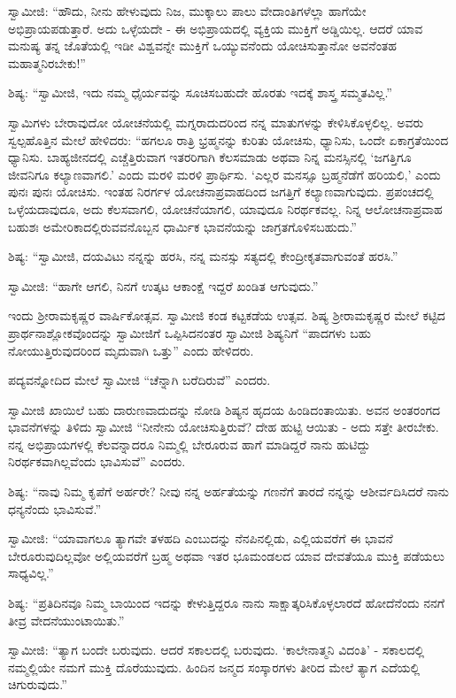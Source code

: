  ಸ್ವಾಮೀಜಿ: “ಹೌದು, ನೀನು ಹೇಳುವುದು ನಿಜ, ಮುಕ್ಕಾಲು ಪಾಲು ವೇದಾಂತಿಗಳೆಲ್ಲಾ ಹಾಗೆಯೇ ಅಭಿಪ್ರಾಯಪಡುತ್ತಾರೆ. ಅದು ಒಳ್ಳೆಯದೇ - ಈ ಅಭಿಪ್ರಾಯದಲ್ಲಿ ವ್ಯಕ್ತಿಯ ಮುಕ್ತಿಗೆ ಅಡ್ಡಿಯಿಲ್ಲ. ಆದರೆ ಯಾವ ಮನುಷ್ಯ ತನ್ನ ಜೊತೆಯಲ್ಲಿ ಇಡೀ ವಿಶ್ವವನ್ನೇ ಮುಕ್ತಿಗೆ ಒಯ್ಯುವನೆಂದು ಯೋಚಿಸುತ್ತಾನೋ ಅವನೆಂತಹ ಮಹಾತ್ಮನಿರಬೇಕು!” 

 ಶಿಷ್ಯ: “ಸ್ವಾಮೀಜಿ, ಇದು ನಮ್ಮ ಧೈರ್ಯವನ್ನು ಸೂಚಿಸಬಹುದೇ ಹೊರತು ಇದಕ್ಕೆ ಶಾಸ್ತ್ರ ಸಮ್ಮತವಿಲ್ಲ.” 

 ಸ್ವಾಮಿಗಳು ಬೇರಾವುದೋ ಯೋಚನೆಯಲ್ಲಿ ಮಗ್ನರಾದುದರಿಂದ ನನ್ನ ಮಾತುಗಳನ್ನು ಕೇಳಿಸಿಕೊಳ್ಳಲಿಲ್ಲ. ಅವರು ಸ್ವಲ್ಪಹೊತ್ತಿನ ಮೇಲೆ ಹೇಳಿದರು: “ಹಗಲೂ ರಾತ್ರಿ ಭ್ರಹ್ಮನನ್ನು ಕುರಿತು ಯೋಚಿಸು, ಧ್ಯಾನಿಸು, ಒಂದೇ ಏಕಾಗ್ರತೆಯಿಂದ ಧ್ಯಾನಿಸು. ಬಾಹ್ಯಜೀನದಲ್ಲಿ ಎಚ್ಚೆತ್ತಿರುವಾಗ ಇತರರಿಗಾಗಿ ಕೆಲಸಮಾಡು ಅಥವಾ ನಿನ್ನ ಮನಸ್ಸಿನಲ್ಲಿ ‘ಜಗತ್ತಿಗೂ ಜೀವನಿಗೂ ಕಲ್ಯಾಣವಾಗಲಿ.’ ಎಂದು ಮರಳಿ ಮರಳಿ ಪ್ರಾರ್ಥಿಸು. ‘ಎಲ್ಲರ ಮನಸ್ಸೂ ಬ್ರಹ್ಮನೆಡೆಗೆ ಹರಿಯಲಿ,’ ಎಂದು ಪುನಃ ಪುನಃ ಯೋಚಿಸು. ಇಂತಹ ನಿರರ್ಗಳ ಯೋಚನಾಪ್ರವಾಹದಿಂದ ಜಗತ್ತಿಗೆ ಕಲ್ಯಾಣವಾಗುವುದು. ಪ್ರಪಂಚದಲ್ಲಿ ಒಳ್ಳೆಯದಾವುದೂ, ಅದು ಕೆಲಸವಾಗಲಿ, ಯೋಚನೆಯಾಗಲಿ, ಯಾವುದೂ ನಿರರ್ಥಕವಲ್ಲ. ನಿನ್ನ ಆಲೋಚನಾಪ್ರವಾಹ ಬಹುಶಃ ಅಮೇರಿಕಾದಲ್ಲಿರುವವನೊಬ್ಬನ ಧಾರ್ಮಿಕ ಭಾವನೆಯನ್ನು ಜಾಗ್ರತಗೊಳಿಸಬಹುದು.” 

 ಶಿಷ್ಯ: “ಸ್ವಾಮೀಜಿ, ದಯವಿಟು ನನ್ನನ್ನು ಹರಸಿ, ನನ್ನ ಮನಸ್ಸು ಸತ್ಯದಲ್ಲಿ ಕೇಂದ್ರೀಕೃತವಾಗುವಂತೆ ಹರಸಿ.” 

 ಸ್ವಾಮೀಜಿ: “ಹಾಗೇ ಆಗಲಿ, ನಿನಗೆ ಉತ್ಕಟ ಆಕಾಂಕ್ಷೆ ಇದ್ದರೆ ಖಂಡಿತ ಆಗುವುದು.” 

\delimiter

 ಇಂದು ಶ‍್ರೀರಾಮಕೃಷ್ಣರ ವಾರ್ಷಿಕೋತ್ಸವ. ಸ್ವಾಮೀಜಿ ಕಂಡ ಕಟ್ಟಕಡೆಯ ಉತ್ಸವ. ಶಿಷ್ಯ ಶ‍್ರೀರಾಮಕೃಷ್ಣರ ಮೇಲೆ ಕಟ್ಟಿದ ಪ್ರಾರ್ಥನಾಶ್ಲೋಕವೊಂದನ್ನು ಸ್ವಾಮೀಜಿಗೆ ಒಪ್ಪಿಸಿದನಂತರ ಸ್ವಾಮೀಜಿ ಶಿಷ್ಯನಿಗೆ “ಪಾದಗಳು ಬಹು ನೋಯುತ್ತಿರುವುದರಿಂದ ಮೃದುವಾಗಿ ಒತ್ತು” ಎಂದು ಹೇಳಿದರು. 

 ಪದ್ಯವನ್ನೋದಿದ ಮೇಲೆ ಸ್ವಾಮೀಜಿ “ಚೆನ್ನಾಗಿ ಬರೆದಿರುವೆ” ಎಂದರು. 

 ಸ್ವಾಮೀಜಿ ಖಾಯಿಲೆ ಬಹು ದಾರುಣವಾದುದನ್ನು ನೋಡಿ ಶಿಷ್ಯನ ಹೃದಯ ಹಿಂಡಿದಂತಾಯಿತು. ಅವನ ಅಂತರಂಗದ ಭಾವನೆಗಳನ್ನು ತಿಳಿದು ಸ್ವಾಮೀಜಿ “ನೀನೇನು ಯೋಚಿಸುತ್ತಿರುವೆ? ದೇಹ ಹುಟ್ಟಿ ಆಯಿತು - ಅದು ಸತ್ತೇ ತೀರಬೇಕು. ನನ್ನ ಅಭಿಪ್ರಾಯಗಳಲ್ಲಿ ಕೆಲವನ್ನಾದರೂ ನಿಮ್ಮಲ್ಲಿ ಬೇರೂರುವ ಹಾಗೆ ಮಾಡಿದ್ದರೆ ನಾನು ಹುಟಿದ್ದು ನಿರರ್ಥಕವಾಗಿಲ್ಲವೆಂದು ಭಾವಿಸುವೆ” ಎಂದರು. 

 ಶಿಷ್ಯ: “ನಾವು ನಿಮ್ಮ ಕೃಪೆಗೆ ಅರ್ಹರೇ? ನೀವು ನನ್ನ ಅರ್ಹತೆಯನ್ನು ಗಣನೆಗೆ ತಾರದೆ ನನ್ನನ್ನು ಆಶೀರ್ವದಿಸಿದರೆ ನಾನು ಧನ್ಯನೆಂದು ಭಾವಿಸುವೆ.” 

 ಸ್ವಾಮೀಜಿ: “ಯಾವಾಗಲೂ ತ್ಯಾಗವೇ ತಳಹದಿ ಎಂಬುದನ್ನು ನೆನಪಿನಲ್ಲಿಡು, ಎಲ್ಲಿಯವರೆಗೆ ಈ ಭಾವನೆ ಬೇರೂರುವುದಿಲ್ಲವೋ ಅಲ್ಲಿಯವರೆಗೆ ಬ್ರಹ್ಮ ಅಥವಾ ಇತರ ಭೂಮಂಡಲದ ಯಾವ ದೇವತೆಯೂ ಮುಕ್ತಿ ಪಡೆಯಲು ಸಾಧ್ಯವಿಲ್ಲ.” 

 ಶಿಷ್ಯ: “ಪ್ರತಿದಿನವೂ ನಿಮ್ಮ ಬಾಯಿಂದ ಇದನ್ನು ಕೇಳುತ್ತಿದ್ದರೂ ನಾನು ಸಾಕ್ಷಾತ್ಕರಿಸಿಕೊಳ್ಳಲಾರದೆ ಹೋದೆನೆಂದು ನನಗೆ ತೀವ್ರ ವೇದನೆಯುಂಟಾಯಿತು.” 

 ಸ್ವಾಮೀಜಿ: “ತ್ಯಾಗ ಬಂದೇ ಬರುವುದು. ಆದರೆ ಸಕಾಲದಲ್ಲಿ ಬರುವುದು. ‘ಕಾಲೇನಾತ್ಮನಿ ವಿದಂತಿ’ - ಸಕಾಲದಲ್ಲಿ ನಮ್ಮಲ್ಲಿಯೇ ನಮಗೆ ಮುಕ್ತಿ ದೊರೆಯುವುದು. ಹಿಂದಿನ ಜನ್ಮದ ಸಂಸ್ಕಾರಗಳು ತೀರಿದ ಮೇಲೆ ತ್ಯಾಗ ಎದೆಯಲ್ಲಿ ಚಿಗುರುವುದು.” 

